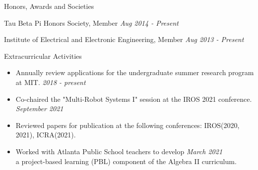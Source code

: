\documentclass{resume} %
\begin{document}
\begin{rSection}{Honors, Awards and Societies}

\begin{rSubsection}{}{}{}{}
\item Tau Beta Pi Honors Society, Member \hfill {\em Aug 2014 - Present}
\item Institute of Electrical and Electronic Engineering, Member \hfill {\em Aug 2013 - Present}
\end{rSubsection}

\end{rSection}

\begin{rSection}{Extracurricular Activities}
\renewcommand\labelitemi{\raisebox{0.15ex}{$\cdot$}}
\begin{itemize}
\setlength{\itemindent}{-2.2em}

\item Annually review applications for the undergraduate summer research program at MIT.
\hfill {\em2018 - present}

\item Co-chaired the "Multi-Robot Systems I" session at the IROS 2021 conference. \hfill {\em September 2021}

\item Reviewed papers for publication at the following conferences: IROS(2020, 2021), ICRA(2021).

\item Worked with Atlanta Public School teachers to develop  \hfill {\em March 2021}\\ a project-based learning (PBL) component of the Algebra II curriculum.

\end{itemize}

\end{rSection}




\end{document}
